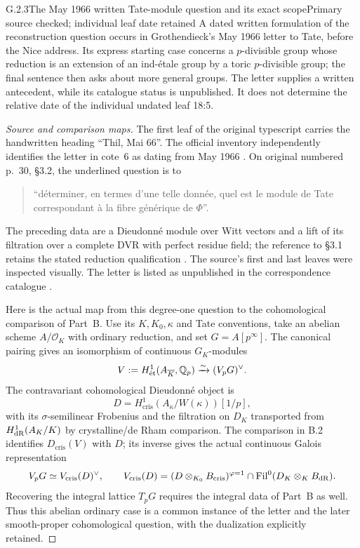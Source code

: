 \begin{result}{G.2.3}{The May 1966 written Tate-module question and its exact scope}{Primary source checked; individual leaf date retained}
A dated written formulation of the reconstruction question occurs in Grothendieck's May 1966 letter to Tate, before the Nice address. Its express starting case concerns a $p$-divisible group whose reduction is an extension of an ind-\'etale group by a toric $p$-divisible group; the final sentence then asks about more general groups. The letter supplies a written antecedent, while its catalogue status is unpublished. It does not determine the relative date of the individual undated leaf 18:5.
\end{result}
\begin{proof}[Source and comparison maps]
The first leaf of the original typescript carries the handwritten heading ``Thil, Mai 66''. The official inventory independently identifies the letter in cote~6 as dating from May 1966 \cite[cote 6]{MontpellierInventory}. On original numbered p.~30, \S3.2, the underlined question is to
\begin{quote}
``d\'eterminer, en termes d'une telle donn\'ee, quel est le module de Tate correspondant \`a la fibre g\'en\'erique de $\Phi$''.
\end{quote}
The preceding data are a Dieudonn\'e module over Witt vectors and a lift of its filtration over a complete DVR with perfect residue field; the reference to \S3.1 retains the stated reduction qualification \cite[\S\S3.1--3.2, pp.29--30]{AuditGrothendieckTate1966}. The source's first and last leaves were inspected visually. The letter is listed as unpublished in the correspondence catalogue \cite{AuditCSGCorrespondenceCatalogue}.

Here is the actual map from this degree-one question to the cohomological comparison of Part~B. Use its $K,K_0,\kappa$ and Tate conventions, take an abelian scheme $A/\mathcal O_K$ with ordinary reduction, and set $G=A[p^\infty]$. The canonical pairing gives an isomorphism of continuous $G_K$-modules
\[
 V:=H^1_{\mathrm{\acute et}}(A_{\overline K},\mathbb Q_p)
 \xrightarrow{\sim}(V_pG)^\vee.
\]
The contravariant cohomological Dieudonn\'e object is
\[
 D=H^1_{\mathrm{cris}}(A_\kappa/W(\kappa))[1/p],
\]
with its $\sigma$-semilinear Frobenius and the filtration on $D_K$
transported from $H^1_{\mathrm{dR}}(A_K/K)$ by crystalline/de Rham comparison.
The comparison in B.2 identifies $D_{\mathrm{cris}}(V)$ with $D$;
its inverse gives the actual continuous Galois representation
\[
 V_pG\simeq V_{\mathrm{cris}}(D)^\vee,
 \qquad
 V_{\mathrm{cris}}(D)=
 (D\otimes_{K_0}B_{\mathrm{cris}})^{\varphi=1}
 \cap\mathrm{Fil}^0(D_K\otimes_KB_{\mathrm{dR}}).
\]
Recovering the integral lattice $T_pG$ requires the integral data of Part~B as well. Thus this abelian ordinary case is a common instance of the letter and the later smooth-proper cohomological question, with the dualization explicitly retained.


\end{proof}
